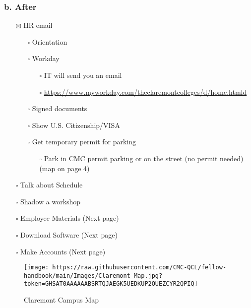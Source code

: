 \documentclass[
]{book}
\providecommand{\tightlist}{%
  \setlength{\itemsep}{0pt}\setlength{\parskip}{0pt}}
\begin{document}
\hypertarget{b.-after}{%
\subsubsection{\texorpdfstring{b. After }{b. After }}\label{b.-after}}

\begin{itemize}
\tightlist
\item[$\boxtimes$]
  HR email

  \begin{itemize}
  \tightlist
  \item[$\square$]
    Orientation
  \item[$\square$]
    Workday

    \begin{itemize}
    \tightlist
    \item[$\square$]
      IT will send you an email
    \item[$\square$]
      \url{https://www.myworkday.com/theclaremontcolleges/d/home.htmld}
    \end{itemize}
  \item[$\square$]
    Signed documents
  \item[$\square$]
    Show U.S. Citizenship/VISA
  \item[$\square$]
    Get temporary permit for parking

    \begin{itemize}
    \tightlist
    \item[$\square$]
      Park in CMC permit parking or on the street (no permit needed)(map on page 4)\\
    \end{itemize}
  \end{itemize}
\item[$\square$]
  Talk about Schedule\\
\item[$\square$]
  Shadow a workshop\\
\item[$\square$]
  Employee Materials (Next page)\\
\item[$\square$]
  Download Software (Next page)\\
\item[$\square$]
  Make Accounts (Next page)
\end{itemize}

\begin{figure}
\centering
\texttt{[image: https://raw.githubusercontent.com/CMC-QCL/fellow-handbook/main/Images/Claremont\_Map.jpg?token=GHSAT0AAAAAABSRTQJAEGK5UEDKUP2OUEZCYR2QPIQ]}
\caption{Claremont Campus Map}
\end{figure}
\end{document}
